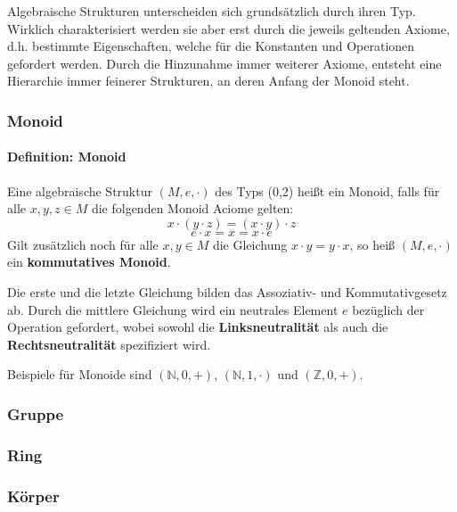 \documentclass[12pt]{article}							%
\begin{document}
Algebraische Strukturen unterscheiden sich grundsätzlich durch ihren Typ. Wirklich charakterisiert werden sie aber erst durch die jeweils geltenden Axiome, d.h. bestimmte Eigenschaften, welche für die Konstanten und Operationen gefordert werden. Durch die Hinzunahme immer weiterer Axiome, entsteht eine Hierarchie immer feinerer Strukturen, an deren Anfang der Monoid steht.

\subsubsection{Monoid}
\paragraph{Definition: Monoid}
Eine algebraische Struktur $(M,e,\cdot)$ des Typs (0,2) heißt ein Monoid, falls für alle $x,y,z\in M$ die folgenden Monoid Aciome gelten: $$x \cdot (y \cdot z) = (x \cdot y) \cdot z$$ $$ e \cdot x = x = x \cdot e$$ Gilt zusätzlich noch für alle $x,y \in M$ die Gleichung $x \cdot y = y \cdot x$, so heiß $(M,e,\cdot)$ ein \textbf{kommutatives Monoid}.

Die erste und die letzte Gleichung bilden das Assoziativ- und Kommutativgesetz ab. Durch die mittlere Gleichung wird ein neutrales Element $e$ bezüglich der Operation gefordert, wobei sowohl die \textbf{Linksneutralität} als auch die \textbf{Rechtsneutralität} spezifiziert wird.

Beispiele für Monoide sind $(\mathbb{N},0,+)$, $(\mathbb{N},1,\cdot)$ und $(\mathbb{Z},0,+)$.
\subsubsection{Gruppe}
\subsubsection{Ring}
\subsubsection{Körper}
\end{document}
